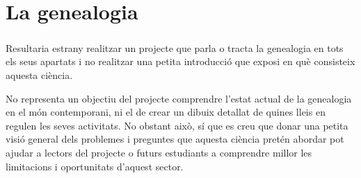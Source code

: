 \chapter{La genealogia}

    \paragraph{}
    Resultaria estrany realitzar un projecte que parla o tracta la genealogia en tots els seus apartats i no realitzar una petita introducció que exposi en què consisteix aquesta ciència.

    No representa un objectiu del projecte comprendre l’estat actual de la genealogia en el món contemporani, ni el de crear un dibuix detallat de quines lleis en regulen les seves activitats. No obstant això, sí que es creu que donar una petita visió general dels problemes i preguntes que aquesta ciència pretén abordar pot ajudar a lectors del projecte o futurs estudiants a comprendre millor les  limitacions i oportunitats d'aquest sector.

    
    
    
    
    
    
